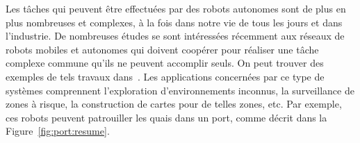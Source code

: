 	

Les tâches qui peuvent être effectuées par des robots autonomes sont
de plus en plus nombreuses et complexes, à la fois dans notre vie de
tous les jours et dans l'industrie.  De nombreuses études se sont
intéressées récemment aux réseaux de robots mobiles et autonomes qui
doivent coopérer pour réaliser une tâche complexe commune qu'ils ne
peuvent accomplir seuls. 
On peut trouver des exemples de tels travaux
dans~\cite{Prencipe13, butucaru_distributed_2011,FPS12}.  Les
applications 
concernées par ce type de systèmes
comprennent l'exploration d'environnements inconnus, la surveillance
de zones à risque, la construction de cartes pour de telles zones,
etc. Par exemple, ces robots peuvent patrouiller les quais dans un
port, comme décrit dans la Figure~\ref{fig:port:resume}.
